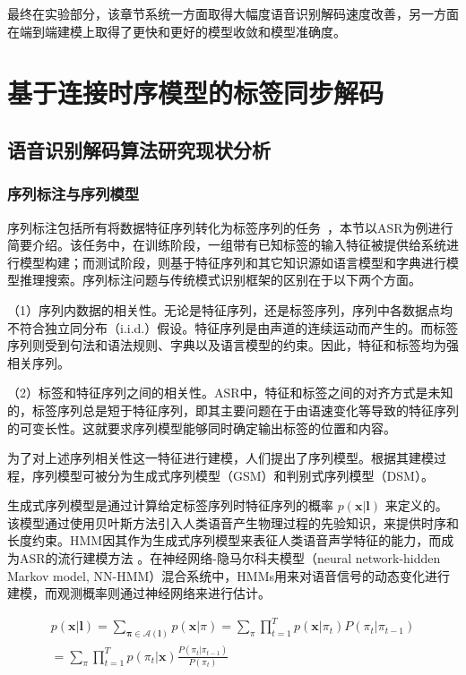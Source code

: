 最终在实验部分，该章节系统一方面取得大幅度语音识别解码速度改善，另一方面在端到端建模上取得了更快和更好的模型收敛和模型准确度。

\section{基于连接时序模型的标签同步解码}
\label{chap:lsd-ctc}
\subsection{语音识别解码算法研究现状分析}
\label{chap:lsd-review}
\subsubsection{序列标注与序列模型}
\label{chap:lsd-review-model}

序列标注包括所有将数据特征序列转化为标签序列的任务~\cite{graves2012supervised}，本节以ASR为例进行简要介绍。该任务中，在训练阶段，一组带有已知标签的输入特征被提供给系统进行模型构建；而测试阶段，则基于特征序列和其它知识源如语言模型和字典进行模型推理搜索。序列标注问题与传统模式识别框架的区别在于以下两个方面。

（1）序列内数据的相关性。无论是特征序列，还是标签序列，序列中各数据点均不符合独立同分布（i.i.d.）假设。特征序列是由声道的连续运动而产生的。而标签序列则受到句法和语法规则、字典以及语言模型的约束。因此，特征和标签均为强相关序列。

（2）标签和特征序列之间的相关性。ASR中，特征和标签之间的对齐方式是未知的，标签序列总是短于特征序列，即其主要问题在于由语速变化等导致的特征序列的可变长性。这就要求序列模型能够同时确定输出标签的位置和内容。

为了对上述序列相关性这一特征进行建模，人们提出了序列模型。根据其建模过程，序列模型可被分为生成式序列模型（GSM）和判别式序列模型（DSM）。

生成式序列模型是通过计算给定标签序列时特征序列的概率 $p(\mathbf{x}|\mathbf{l})$ 来定义的。该模型通过使用贝叶斯方法引入人类语音产生物理过程的先验知识，来提供时序和长度约束。HMM因其作为生成式序列模型来表征人类语音声学特征的能力，而成为ASR的流行建模方法 。在神经网络-隐马尔科夫模型（neural network-hidden Markov model, NN-HMM）混合系统中，HMMs用来对语音信号的动态变化进行建模，而观测概率则通过神经网络来进行估计。
  
  \begin{equation}
\label{equ:hmm-model}
\begin{split}
p(\mathbf{x}|\mathbf{l})=\sum_{\mathbf{\pi}\in\mathcal{A}(\mathbf{l})}p(\mathbf{x}|\pi) =\sum_{\pi}\prod_{t=1}^{T} p(\mathbf{x}|\pi_t) P(\pi_t|\pi_{t-1})\\
=\sum_{\pi}\prod_{t=1}^{T} p(\pi_t|\mathbf{x})\frac{P(\pi_t|\pi_{t-1})}{P(\pi_t)}
\end{split}
\end{equation}

